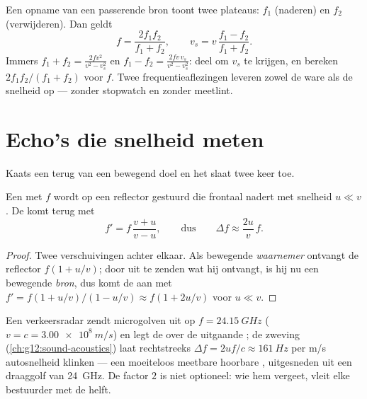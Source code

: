 \begin{method}\label{met:g12:doppler-effect:pass}
Een opname van een passerende bron toont twee plateaus: $f_1$ (naderen) en
$f_2$ (verwijderen). Dan geldt
\[
f = \frac{2 f_1 f_2}{f_1 + f_2}, \qquad
v_s = v\,\frac{f_1 - f_2}{f_1 + f_2}.
\]
Immers $f_1 + f_2 = \frac{2fv^2}{v^2 - v_s^2}$ en
$f_1 - f_2 = \frac{2fv\,v_s}{v^2 - v_s^2}$: deel om $v_s$ te krijgen, en
bereken $2f_1 f_2/(f_1 + f_2)$ voor $f$. Twee frequentieaflezingen leveren
zowel de ware  als de snelheid op --- zonder stopwatch en zonder
meetlint.
\end{method}

\section{Echo's die snelheid meten}

Kaats een  terug van een bewegend doel en het  slaat twee
keer toe.

\begin{proposition}\label{prop:g12:doppler-effect:double}
Een  met  $f$ wordt op een reflector gestuurd die frontaal
nadert met snelheid $u \ll v$. De  komt terug met
\[ f' = f\,\frac{v + u}{v - u}, \qquad \text{dus} \qquad \Delta f \approx \frac{2u}{v}\,f . \]
\end{proposition}

\begin{proof}
Twee verschuivingen achter elkaar. Als bewegende \emph{waarnemer}
ontvangt de reflector $f(1 + u/v)$; door uit te zenden wat hij ontvangt,
is hij nu een bewegende \emph{bron}, dus komt de  aan met
$f' = f(1 + u/v)/(1 - u/v) \approx f(1 + 2u/v)$ voor $u \ll v$.
\end{proof}

\begin{example}[De snelheidsradar]\label{ex:g12:doppler-effect:radar}
Een verkeersradar zendt microgolven uit op $f = \qty{24.15}{GHz}$
($v = c = \qty{3.00e8}{m/s}$) en legt de  over de uitgaande ; de
zweving (\cref{ch:g12:sound-acoustics}) laat rechtstreeks
$\Delta f = 2uf/c \approx \qty{161}{Hz}$ per \unit{m/s} autosnelheid
klinken --- een moeiteloos meetbare hoorbare , uitgesneden uit
een draaggolf van \qty{24}{GHz}. De factor $2$ is niet optioneel: wie hem
vergeet, vleit elke bestuurder met de helft.
\end{example}

